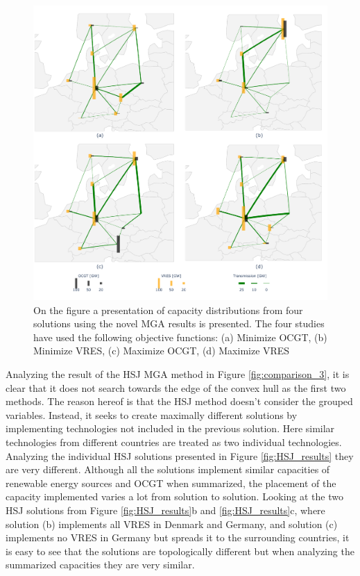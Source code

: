 \begin{figure}[h]\centering
	\includegraphics[width=1.\textwidth,trim={0 0cm 0 0cm},clip]{./Images/MGA_sum}
	\caption{On the figure a presentation of capacity distributions from four solutions using the novel MGA results is presented. The four studies have used the following objective functions: (a) Minimize OCGT, (b) Minimize VRES, (c) Maximize OCGT, (d) Maximize VRES}
	\label{fig:MGA_sum_results}
\end{figure}


Analyzing the result of the HSJ MGA method in Figure \ref{fig:comparison_3}, it is clear that it does not search towards the edge of the convex hull as the first two methods. The reason hereof is that the HSJ method doesn't consider the grouped variables. Instead, it seeks to create maximally different solutions by implementing technologies not included in the previous solution. Here similar technologies from different countries are treated as two individual technologies. Analyzing the individual HSJ solutions presented in Figure \ref{fig:HSJ_results} they are very different. Although all the solutions implement similar capacities of renewable energy sources and OCGT when summarized, the placement of the capacity implemented varies a lot from solution to solution. Looking at the two HSJ solutions from Figure \ref{fig:HSJ_results}b and \ref{fig:HSJ_results}c, where solution (b) implements all VRES in Denmark and Germany, and solution (c) implements no VRES in Germany but spreads it to the surrounding countries, it is easy to see that the solutions are topologically different but when analyzing the summarized capacities they are very similar. 

